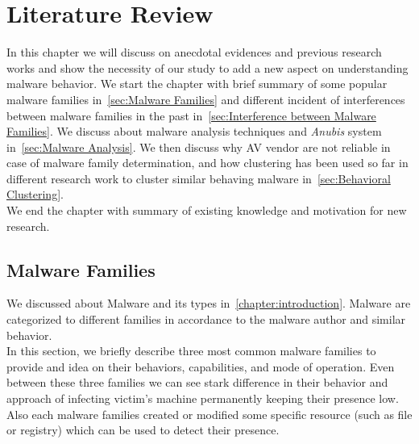 \chapter{Literature Review}\label{chapter:literature_review}
In this chapter we will discuss on anecdotal evidences and previous research works and show the necessity of our study to add a new aspect on understanding malware behavior.
We start the chapter with brief summary of some popular malware families in~\autoref{sec:Malware Families} and different incident of interferences between malware families in the past in~\autoref{sec:Interference between Malware Families}.
We discuss about malware analysis techniques and \emph{Anubis} system in~\autoref{sec:Malware Analysis}.
We then discuss why AV vendor are not reliable in case of malware family determination, and how clustering has been used so far in different research work to cluster similar behaving malware in~\autoref{sec:Behavioral Clustering}.\\
We end the chapter with summary of existing knowledge and motivation for new research.
\section{Malware Families}
\label{sec:Malware Families}
We discussed about Malware and its types in~\autoref{chapter:introduction}.
Malware are categorized to different families in accordance to the malware author and similar behavior.\\
In this section, we briefly describe three most common malware families to provide and idea on their behaviors, capabilities, and mode of operation.
Even between these three families we can see stark difference in their behavior and approach of infecting victim's machine permanently keeping their presence low.
Also each malware families created or modified some specific resource (such as file or registry) which can be used to detect their presence.
